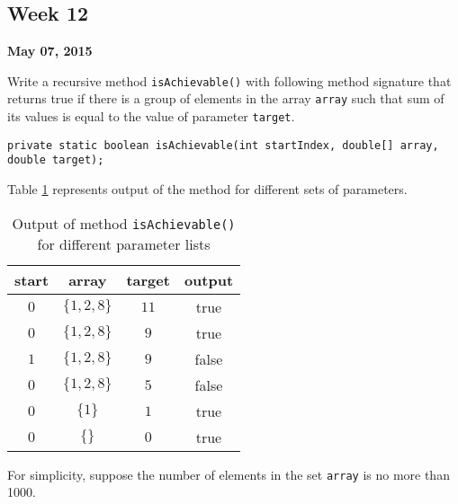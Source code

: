 \documentclass[12pt,letterpaper,twoside]{article}
\begin{document}




\subsection*{Week 12}
\hfill \textbf{May 07, 2015}

Write a recursive method \texttt{isAchievable()} with following method signature that returns true if there is a group of elements in the array \texttt{array} such that sum of its values is equal to the value of parameter \texttt{target}.

\lstset{language=java,tabsize=2,numbers=none}
\begin{lstlisting}
private static boolean isAchievable(int startIndex, double[] array, double target);
\end{lstlisting}

Table \ref{tab2} represents output of the method for different sets of parameters.

\begin{table}[H]\centering
\begin{tabular}{cccc}
\hline
start & array & target & output\\
\hline
$0$ & $\{1, 2, 8\}$ & $11$ & true\\
$0$ & $\{1, 2, 8\}$ & $9$  & true\\
$1$ & $\{1, 2, 8\}$ & $9$  & false\\
$0$ & $\{1, 2, 8\}$ & $5$  & false\\
$0$ & $\{1\}$       & $1$  & true\\
$0$ & $\{\} $       & $0$  & true\\
\hline
\end{tabular}
\caption{Output of method \texttt{isAchievable()} for different parameter lists}\label{tab2}
\end{table}

For simplicity, suppose the number of elements in the set \texttt{array} is no more than 1000.
\end{document}
